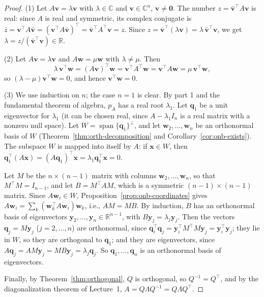 \documentclass[11pt]{article}
\theoremstyle{definition}
\theoremstyle{plain}
\theoremstyle{remark}
\DeclareMathOperator{\Span}{span}
\begin{document}
\begin{proof}
    (1) Let $A\mathbf{v} = \lambda \mathbf{v}$ with $\lambda \in \mathbb{C}$ and $\mathbf{v} \in \mathbb{C}^n$, $\mathbf{v} \neq \mathbf{0}$. The number $z = \bar{\mathbf{v}}^\top A \mathbf{v}$ is real: since $A$ is real and symmetric, its complex conjugate is $\bar{z} = \mathbf{v}^\top A \bar{\mathbf{v}} = (\mathbf{v}^\top A \bar{\mathbf{v}})^\top = \bar{\mathbf{v}}^\top A^\top \mathbf{v} = z$. Since $z = \bar{\mathbf{v}}^\top (\lambda \mathbf{v}) = \lambda\, \bar{\mathbf{v}}^\top \mathbf{v}$, we get $\lambda = z / (\bar{\mathbf{v}}^\top \mathbf{v}) \in \mathbb{R}$.

    (2) Let $A\mathbf{v} = \lambda \mathbf{v}$ and $A\mathbf{w} = \mu \mathbf{w}$ with $\lambda \neq \mu$. Then
    \[\lambda\, \mathbf{v}^\top \mathbf{w} = (A\mathbf{v})^\top \mathbf{w} = \mathbf{v}^\top A^\top \mathbf{w} = \mathbf{v}^\top A \mathbf{w} = \mu\, \mathbf{v}^\top \mathbf{w},\]
    so $(\lambda - \mu) \mathbf{v}^\top \mathbf{w} = 0$, and hence $\mathbf{v}^\top \mathbf{w} = 0$.

    (3) We use induction on $n$; the case $n = 1$ is clear. By part 1 and the fundamental theorem of algebra, $p_A$ has a real root $\lambda_1$. Let $\mathbf{q}_1$ be a unit eigenvector for $\lambda_1$ (it can be chosen real, since $A - \lambda_1 I_n$ is a real matrix with a nonzero null space). Let $W = \Span\{\mathbf{q}_1\}^\perp$, and let $\mathbf{w}_2, \ldots, \mathbf{w}_n$ be an orthonormal basis of $W$ (Theorem~\ref{thm:orth-decomposition} and Corollary~\ref{cor:onb-exists}). The subspace $W$ is mapped into itself by $A$: if $\mathbf{x} \in W$, then $\mathbf{q}_1^\top (A\mathbf{x}) = (A\mathbf{q}_1)^\top \mathbf{x} = \lambda_1 \mathbf{q}_1^\top \mathbf{x} = 0$.

    Let $M$ be the $n \times (n-1)$ matrix with columns $\mathbf{w}_2, \ldots, \mathbf{w}_n$, so that $M^\top M = I_{n-1}$, and let $B = M^\top A M$, which is a symmetric $(n-1) \times (n-1)$ matrix. Since $A\mathbf{w}_i \in W$, Proposition~\ref{prop:onb-coordinates} gives $A\mathbf{w}_i = \sum_k (\mathbf{w}_k^\top A \mathbf{w}_i) \mathbf{w}_k$, i.e., $AM = MB$. By induction, $B$ has an orthonormal basis of eigenvectors $\mathbf{y}_2, \ldots, \mathbf{y}_n \in \mathbb{R}^{n-1}$, with $B\mathbf{y}_j = \lambda_j \mathbf{y}_j$. Then the vectors $\mathbf{q}_j = M \mathbf{y}_j$ ($j = 2, \ldots, n$) are orthonormal, since $\mathbf{q}_i^\top \mathbf{q}_j = \mathbf{y}_i^\top M^\top M \mathbf{y}_j = \mathbf{y}_i^\top \mathbf{y}_j$; they lie in $W$, so they are orthogonal to $\mathbf{q}_1$; and they are eigenvectors, since $A\mathbf{q}_j = AM\mathbf{y}_j = MB\mathbf{y}_j = \lambda_j \mathbf{q}_j$. So $\mathbf{q}_1, \ldots, \mathbf{q}_n$ is an orthonormal basis of eigenvectors.

    Finally, by Theorem~\ref{thm:orthogonal}, $Q$ is orthogonal, so $Q^{-1} = Q^\top$, and by the diagonalization theorem of Lecture~1, $A = Q\Lambda Q^{-1} = Q\Lambda Q^\top$.
\end{proof}
\end{document}
